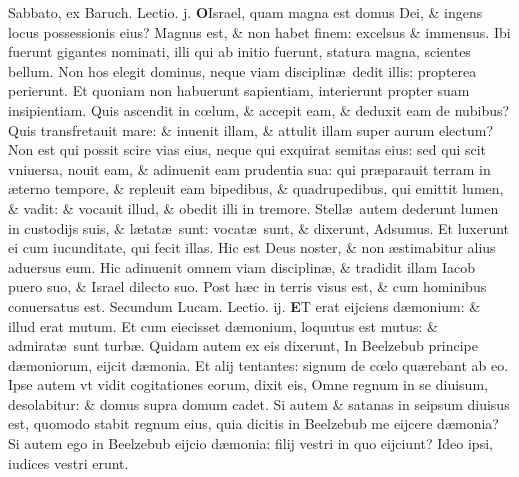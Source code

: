 \documentclass[a5paper,10pt]{book}
\def\leftmarginnote{%
	\lrmarginnote{\hskip -\marginparsep \hskip -6.5em}}
\def\rightmarginnote{%
	\lrmarginnote{\hskip\columnwidth \hskip -1em}}
\def\ae{æ}
\def\oe{œ}
\begin{document}
\begin{multicols*}{2}
\newline {} \color{red} \hypertarget{SAT-QVARTA-ADV}{Sabbato,} ex Baruch. \hfill Lectio. j. \color{black}%
\vspace{-.25em}
\lettrine[lines=2]{\bfseries O}{}Israel, quam\leftmarginnote{\begin{flushright}ca. 3.\end{flushright}} magna est domus Dei, \& ingens locus possessionis eius?
Magnus est, \& non habet finem: excelsus \& immensus.
Ibi fuerunt gigantes nominati, illi qui ab initio fuerunt, statura magna, scientes bellum.
Non hos elegit dominus, neque viam disciplin\ae \ dedit illis:
propterea perierunt.
Et quoniam non habuerunt sapientiam, interierunt propter suam insipientiam.
Quis ascendit in c\oe lum, \& accepit eam, \& deduxit eam de nubibus? Quis transfretauit mare: \& inuenit illam, \& attulit illam super aurum electum?
Non est qui possit scire vias eius, neque qui exquirat semitas eius: sed qui scit vniuersa, nouit eam, \& adinuenit eam prudentia sua: qui pr\ae parauit terram in \ae terno tempore, \& repleuit eam bipedibus, \& quadrupedibus, qui emittit lumen, \& vadit: \& vocauit illud, \& obedit illi in tremore.
Stell\ae \ autem dederunt lumen in custodijs suis, \& l\ae tat\ae \ sunt: vocat\ae \ sunt, \& dixerunt, Adsumus.
Et luxerunt ei cum iucunditate, qui fecit illas.
Hic est Deus noster, \& non \ae stimabitur alius aduersus eum.
Hic adinuenit omnem viam disciplin\ae , \& tradidit illam Iacob puero suo, \& Israel dilecto suo.
Post h\ae c in terris visus est, \& cum hominibus conuersatus est.
\newline \color{red} Secundum Lucam. \hfill Lectio. ij. \color{black}
\vspace{-1.25em}
\lettrine[lines=2]{\bfseries \color{red} E}{}\textdagger T\rightmarginnote{c. 11.\\c} erat eijciens d\ae monium: \& illud erat mutum.
Et cum eiecisset d\ae monium, loquutus est mutus: \& admirat\ae \ sunt turb\ae .
Quidam autem ex eis dixerunt, In Beelzebub principe d\ae moniorum, eijcit d\ae monia.
Et alij tentantes: signum de c\oe lo qu\ae rebant ab eo.
Ipse autem vt vidit cogitationes eorum, dixit eis, Omne regnum in se diuisum, desolabitur: \& domus supra domum cadet.
Si autem \& satanas in seipsum diuisus est, quomodo stabit regnum eius, quia dicitis in Beelzebub me eijcere d\ae monia?
Si autem ego in Beelzebub eijcio d\ae monia: filij vestri in quo eijciunt? Ideo ipsi, iudices vestri erunt.

\end{multicols*}
\end{document}
